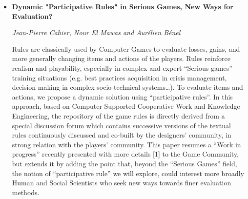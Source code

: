 \documentclass[a4paper,12pt,svgnames]{report}
\begin{document}
\begin{itemize}
\item \textbf{Dynamic "Participative Rules" in Serious Games, New Ways for
Evaluation?}

\textit{Jean-Pierre Cahier, Nour El Mawas and Aurélien Bénel}

Rules are classically used by Computer Games to evaluate losses, gains, and more
generally changing items and actions of the players. Rules reinforce realism and
playability, especially in complex and expert “Serious games” training
situations (e.g. best practices acquisition in crisis management, decision
making in complex socio-technical systems…). To evaluate items and actions, we
propose a dynamic solution using “participative rules”. In this approach, based
on Computer Supported Cooperative Work and Knowledge Engineering, the repository
of the game rules is directly derived from a special discussion forum which
contains successive versions of the textual rules continuously discussed and
co-built by the designers’ community, in strong relation with the players’
community. This paper resumes a “Work in progress” recently presented with more
details [1] to the Game Community, but extends it by adding the point that,
beyond the “Serious Games” field, the notion of “participative rule” we will
explore, could interest more broadly Human and Social Scientists who seek new
ways towards finer evaluation methods.
\end{itemize}
\end{document}
